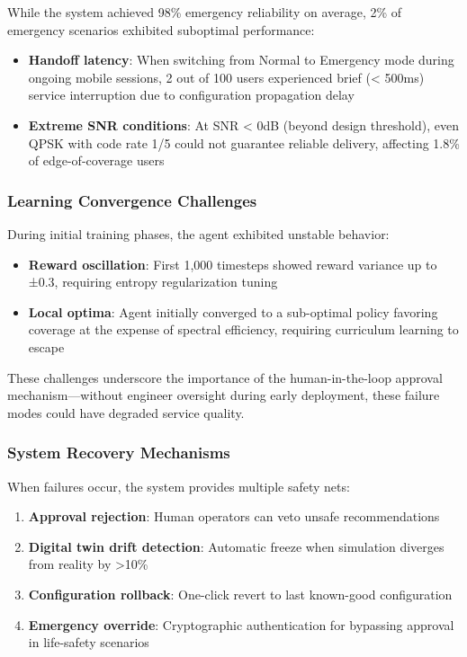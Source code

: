 \documentclass[conference]{IEEEtran}
\begin{document}
While the system achieved 98\% emergency reliability on average, 2\% of emergency scenarios exhibited suboptimal performance:
\begin{itemize}
\item \textbf{Handoff latency}: When switching from Normal to Emergency mode during ongoing mobile sessions, 2 out of 100 users experienced brief (< 500ms) service interruption due to configuration propagation delay
\item \textbf{Extreme SNR conditions}: At SNR < 0dB (beyond design threshold), even QPSK with code rate 1/5 could not guarantee reliable delivery, affecting 1.8\% of edge-of-coverage users
\end{itemize}

\subsubsection{Learning Convergence Challenges}

During initial training phases, the agent exhibited unstable behavior:
\begin{itemize}
\item \textbf{Reward oscillation}: First 1,000 timesteps showed reward variance up to ±0.3, requiring entropy regularization tuning
\item \textbf{Local optima}: Agent initially converged to a sub-optimal policy favoring coverage at the expense of spectral efficiency, requiring curriculum learning to escape
\end{itemize}

These challenges underscore the importance of the human-in-the-loop approval mechanism—without engineer oversight during early deployment, these failure modes could have degraded service quality.

\subsubsection{System Recovery Mechanisms}

When failures occur, the system provides multiple safety nets:
\begin{enumerate}
\item \textbf{Approval rejection}: Human operators can veto unsafe recommendations
\item \textbf{Digital twin drift detection}: Automatic freeze when simulation diverges from reality by >10\%
\item \textbf{Configuration rollback}: One-click revert to last known-good configuration
\item \textbf{Emergency override}: Cryptographic authentication for bypassing approval in life-safety scenarios
\end{enumerate}
\end{document}
